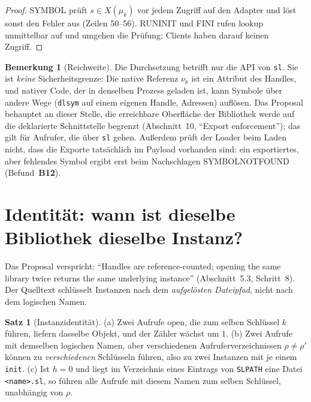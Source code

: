 \documentclass[a4paper,12pt,twoside]{report}
\DeclareRobustCommand{\_}{\ifmmode\mbox{\textunderscore}\else\textunderscore\allowbreak{}\fi}
\theoremstyle{definition}
\newtheorem{satz}{Satz}[chapter]
\newtheorem{bemerkung}{Bemerkung}[chapter]
\newcommand{\Bf}[1]{\textbf{B#1}}
\begin{document}
\begin{proof}
	SYMBOL prüft $s\in X(\mu_k)$ vor jedem Zugriff auf den Adapter und löst sonst den Fehler aus (Zeilen 50--56). RUN\_INIT und FINI rufen $\mathrm{lookup}$ unmittelbar auf und umgehen die Prüfung; Clients haben darauf keinen Zugriff.
\end{proof}

\begin{bemerkung}[Reichweite]
	Die Durchsetzung betrifft nur die API von \texttt{sl}. Sie ist \emph{keine} Sicherheitsgrenze: Die native Referenz $\nu_k$ ist ein Attribut des Handles, und nativer Code, der in denselben Prozess geladen ist, kann Symbole über andere Wege (\texttt{dlsym} auf einem eigenen Handle, Adressen) auflösen. Das Proposal behauptet an dieser Stelle, die erreichbare Oberfläche der Bibliothek werde auf die deklarierte Schnittstelle begrenzt (Abschnitt~10, ``Export enforcement''); das gilt für Aufrufer, die über \texttt{sl} gehen. Außerdem prüft der Loader beim Laden nicht, dass die Exporte tatsächlich im Payload vorhanden sind: ein exportiertes, aber fehlendes Symbol ergibt erst beim Nachschlagen SYMBOL\_NOT\_FOUND (Befund~\Bf{12}).
\end{bemerkung}

\section{Identität: wann ist dieselbe Bibliothek dieselbe Instanz?}
\label{sec:identitaet}

Das Proposal verspricht: ``Handles are reference-counted; opening the same library twice returns the same underlying instance'' (Abschnitt~5.3, Schritt~8). Der Quelltext schlüsselt Instanzen nach dem \emph{aufgelösten Dateipfad}, nicht nach dem logischen Namen.

\begin{satz}[Instanzidentität]
	\label{satz:instanz}
	(a) Zwei Aufrufe $\mathrm{open}$, die zum selben Schlüssel $k$ führen, liefern dasselbe Objekt, und der Zähler wächst um $1$. (b) Zwei Aufrufe mit demselben logischen Namen, aber verschiedenen Aufruferverzeichnissen $\rho\ne\rho'$ können zu \emph{verschiedenen} Schlüsseln führen, also zu zwei Instanzen mit je einem \texttt{init}. (c) Ist $h=0$ und liegt im Verzeichnis eines Eintrags von \texttt{SL\_PATH} eine Datei \texttt{<name>.sl}, so führen alle Aufrufe mit diesem Namen zum selben Schlüssel, unabhängig von $\rho$.
\end{satz}
\end{document}
